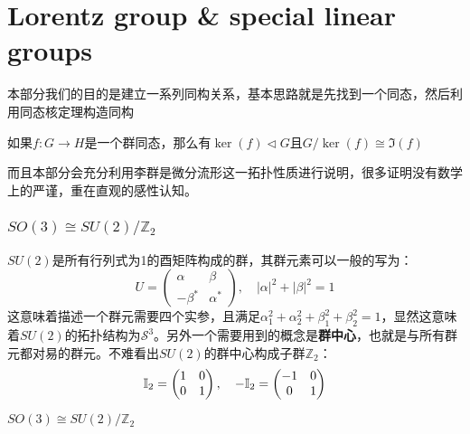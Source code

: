 \part{Lorentz group \& special linear groups}
\setcounter{theorem}{0}
\setcounter{definition}{0}
\setcounter{lemma}{0}
\setcounter{sidenote}{1}

本部分我们的目的是建立一系列同构关系，基本思路就是先找到一个同态，然后利用同态核定理构造同构
\begin{theorem}[同态核定理]
	如果$f:G\to H$是一个群同态，那么有$\ker(f)\lhd G$且$G/\ker(f)\cong\Im(f)$
\end{theorem}
而且本部分会充分利用李群是微分流形这一拓扑性质进行说明，很多证明没有数学上的严谨，重在直观的感性认知。
\section{$SO(3)\cong SU(2)/\mathbb{Z}_2$}
$SU(2)$是所有行列式为1的酉矩阵构成的群，其群元素可以一般的写为：
\[
U=
\begin{pmatrix}
	\alpha & \beta\\
	-\beta^* &\alpha^*
\end{pmatrix},\quad |\alpha|^2+|\beta|^2=1
\]
这意味着描述一个群元需要四个实参，且满足$\alpha_1^2+\alpha_2^2+\beta_1^2+\beta_2^2=1$，显然这意味着$SU(2)$的拓扑结构为$\mathcal{S}^3$。另外一个需要用到的概念是\textbf{群中心}，也就是与所有群元都对易的群元。不难看出$SU(2)$的群中心构成子群$\mathbb{Z}_2$：
\[
\mathbb{I}_2=\begin{pmatrix}
	1 & 0\\
	0 &1
\end{pmatrix},\quad
-\mathbb{I}_2=\begin{pmatrix}
	-1 &0\\
	0 &\-1
\end{pmatrix}
\]
\begin{theorem}
$
		SO(3)\cong SU(2)/\mathbb{Z}_2
$
\end{theorem}

